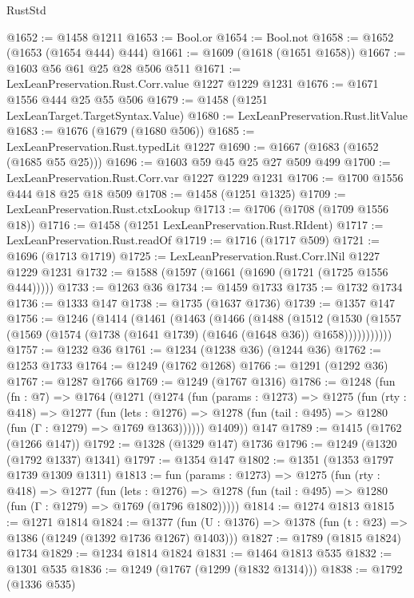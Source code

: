 \begin{lexlean}{RustStd}
\begin{coremodule}
{\begin{coremodule}
{{{{{{{{{{{@1652 := @1458 @1211
@1653 := Bool.or
@1654 := Bool.not
@1658 := @1652 (@1653 (@1654 @444) @444)
@1661 := @1609 (@1618 (@1651 @1658))
@1667 := @1603 @56 @61 @25 @28 @506 @511
@1671 := LexLeanPreservation.Rust.Corr.value @1227 @1229 @1231
@1676 := @1671 @1556 @444 @25 @55 @506
@1679 := @1458 (@1251 LexLeanTarget.TargetSyntax.Value)
@1680 := LexLeanPreservation.Rust.litValue
@1683 := @1676 (@1679 (@1680 @506))
@1685 := LexLeanPreservation.Rust.typedLit @1227
@1690 := @1667 (@1683 (@1652 (@1685 @55 @25)))
@1696 := @1603 @59 @45 @25 @27 @509 @499
@1700 := LexLeanPreservation.Rust.Corr.var @1227 @1229 @1231
@1706 := @1700 @1556 @444 @18 @25 @18 @509
@1708 := @1458 (@1251 @1325)
@1709 := LexLeanPreservation.Rust.ctxLookup
@1713 := @1706 (@1708 (@1709 @1556 @18))
@1716 := @1458 (@1251 LexLeanPreservation.Rust.RIdent)
@1717 := LexLeanPreservation.Rust.readOf
@1719 := @1716 (@1717 @509)
@1721 := @1696 (@1713 @1719)
@1725 := LexLeanPreservation.Rust.Corr.lNil @1227 @1229 @1231
@1732 := @1588 (@1597 (@1661 (@1690 (@1721 (@1725 @1556 @444)))))
@1733 := @1263 @36
@1734 := @1459 @1733
@1735 := @1732 @1734
@1736 := @1333 @147
@1738 := @1735 (@1637 @1736)
@1739 := @1357 @147
@1756 := @1246
    (@1414
      (@1461
        (@1463
          (@1466
            (@1488
              (@1512
                (@1530
                  (@1557 (@1569 (@1574 (@1738 (@1641 @1739) (@1646 (@1648 @36)) @1658)))))))))))
@1757 := @1232 @36
@1761 := @1234 (@1238 @36) (@1244 @36)
@1762 := @1253 @1733
@1764 := @1249 (@1762 @1268)
@1766 := @1291 (@1292 @36)
@1767 := @1287 @1766
@1769 := @1249 (@1767 @1316)
@1786 := @1248
    (fun (fn : @7) =>
    @1764
      (@1271
        (@1274
          (fun (params : @1273) =>
          @1275
            (fun (rty : @418) =>
            @1277
              (fun (lets : @1276) =>
              @1278 (fun (tail : @495) => @1280 (fun (Γ : @1279) => @1769 @1363))))))
        @1409))
    @147
@1789 := @1415 (@1762 (@1266 @147))
@1792 := @1328 (@1329 @147) @1736
@1796 := @1249 (@1320 (@1792 @1337) @1341)
@1797 := @1354 @147
@1802 := @1351 (@1353 @1797 @1739 @1309 @1311)
@1813 := fun (params : @1273) =>
  @1275
    (fun (rty : @418) =>
    @1277
      (fun (lets : @1276) =>
      @1278 (fun (tail : @495) => @1280 (fun (Γ : @1279) => @1769 (@1796 @1802)))))
@1814 := @1274 @1813
@1815 := @1271 @1814
@1824 := @1377 (fun (U : @1376) => @1378 (fun (t : @23) => @1386 (@1249 (@1392 @1736 @1267) @1403)))
@1827 := @1789 (@1815 @1824) @1734
@1829 := @1234 @1814 @1824
@1831 := @1464 @1813 @535
@1832 := @1301 @535
@1836 := @1249 (@1767 (@1299 (@1832 @1314)))
@1838 := @1792 (@1336 @535)
}}}}}}}}}}}
\end{coremodule}}
\end{coremodule}
\end{lexlean}
